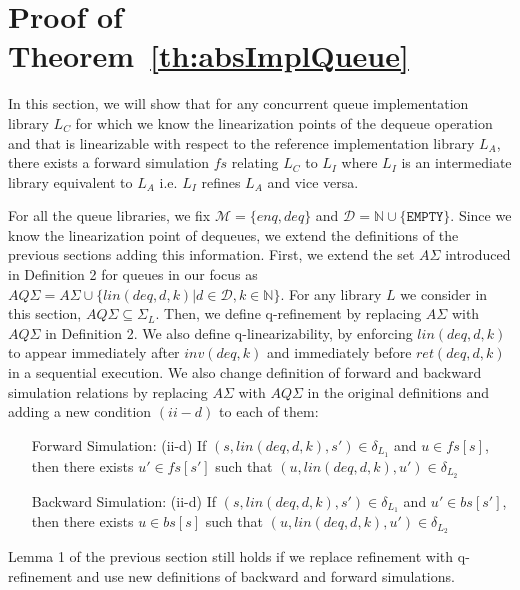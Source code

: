\section{Proof of Theorem~\ref{th:absImplQueue}}\label{app:absImplQueue}

In this section, we will show that for any concurrent queue implementation library $L_C$ for which we know the linearization points of the dequeue operation and that is linearizable with respect to the reference implementation library $L_A$, there exists a forward simulation $fs$ relating $L_C$ to $L_I$ where $L_I$ is an intermediate library equivalent to $L_A$ i.e. $L_I$ refines $L_A$ and vice versa.  

For all the queue libraries, we fix $\mathcal{M} = \{ enq, deq \}$ and $\mathcal{D} = \mathbb{N} \cup \{\texttt{EMPTY} \}$. Since we know the linearization point of dequeues, we extend the definitions of the previous sections adding this information. First, we extend the set $A\Sigma$ introduced in Definition 2 for queues in our focus as $AQ\Sigma = A\Sigma \cup \{lin(deq,d,k)| d \in \mathcal{D}, k \in \mathbb{N}\}$. For any library $L$ we consider in this section, $AQ\Sigma \subseteq \Sigma_L$. Then, we define q-refinement by replacing $A\Sigma$ with $AQ\Sigma$ in Definition 2. We also define q-linearizability, by enforcing $lin(deq,d,k)$ to appear immediately after $inv(deq,k)$ and immediately before $ret(deq,d,k)$ in a sequential execution. We also change definition of forward and backward simulation relations by replacing $A\Sigma$ with $AQ\Sigma$ in the original definitions and adding a new condition $(ii-d)$ to each of them:
\begin{itemize}
\item[Forward Simulation: (ii-d)] If $(s, lin(deq,d,k), s') \in \delta_{L_1}$ and $u \in fs[s]$, then there exists $u' \in fs[s']$ such that $(u, lin(deq,d,k), u') \in \delta_{L_2}$
\item[Backward Simulation: (ii-d)] If $(s, lin(deq,d,k), s') \in \delta_{L_1}$ and $u' \in bs[s']$, then there exists $u \in bs[s]$ such that $(u, lin(deq,d,k), u') \in \delta_{L_2}$
\end{itemize}
Lemma 1 of the previous section still holds if we replace refinement with q-refinement and use new definitions of backward and forward simulations.

